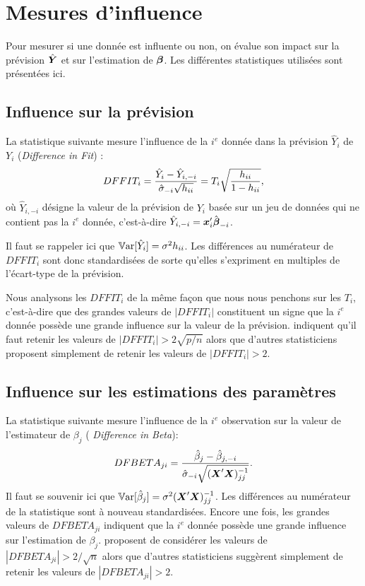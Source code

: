 
\section{Mesures d'influence}

Pour mesurer si une donnée est influente ou non, on évalue son impact sur la prévision $\hat{\mbox{\boldmath$Y$\unboldmath}}$ et sur l'estimation de $\mbox{\boldmath$\beta$}$. Les différentes statistiques utilisées sont présentées ici.

\subsection{Influence sur la prévision}
La statistique suivante mesure l'influence de la $i^e$ donnée
dans la prévision $\hat{Y}_i$ de $Y_i$ (\textit{Difference in Fit}) :
$$DFFIT_i={\hat{Y}_i-\hat{Y}_{i,-i}\over
\hat\sigma_{-i}\sqrt{h_{ii}}}=T_i\sqrt{h_{ii}\over1-h_{ii}},$$ o\`u
$\hat{Y}_{i,-i}$ désigne la valeur de la prévision de $Y_i$ basée
sur un jeu de données qui ne contient pas la $i^e$ donnée,
c'est-à-dire $\hat{Y}_{i,-i}=\mbox{\boldmath$x$\unboldmath}_i'\hat{\mbox{\boldmath$\beta$}}_{-i}$.

Il faut se rappeler ici que $\mathbb{V}\text{ar}[\hat Y_i]=\sigma^2h_{ii}$. Les différences au numérateur de $DFFIT_i$ sont donc standardisées de sorte qu'elles s'expriment en multiples de l'écart-type de la prévision.

Nous analysons les $DFFIT_i$ de la m\^eme fa\c{c}on que nous nous penchons sur les $T_i$, c'est-à-dire que des grandes valeurs de $|DFFIT_i|$ constituent un signe que la $i^e$ donnée possède une grande influence sur la valeur de la prévision. \citet{Bel_Kuh_Wel:80} indiquent qu'il faut retenir les valeurs de $|DFFIT_i|>2\sqrt{p/n}$ alors que d'autres statisticiens proposent simplement de retenir les valeurs de $|DFFIT_i|>2$.

\subsection{Influence sur les estimations des paramètres}
La statistique suivante mesure l'influence de la $i^e$
observation sur la valeur de l'estimateur de $\beta_j$ (\textit{ Difference in Beta}):
$$DFBETA_{ji}={\hat{\beta}_j-\hat{\beta}_{j,-i}\over
\hat\sigma_{-i}\sqrt{(\mbox{\boldmath$X$\unboldmath}'\mbox{\boldmath$X$\unboldmath})^{-1}_{jj}}}.$$
Il faut se souvenir ici que $\mathbb{V}\text{ar}[\hat\beta_j]=\sigma^2(\mbox{\boldmath$X$\unboldmath}'\mbox{\boldmath$X$\unboldmath})^{-1}_{jj}$. Les différences au numérateur de la statistique sont  à nouveau standardisées.
Encore une fois, les grandes valeurs de $DFBETA_{ji}$ indiquent que la $i^e$ donnée possède une grande influence sur l'estimation de $\beta_j$. \citet{Bel_Kuh_Wel:80} proposent de considérer les valeurs de $|DFBETA_{ji}|>2/\sqrt{n}$ alors que d'autres statisticiens suggèrent simplement de retenir les valeurs de $|DFBETA_{ji}|>2$. \\

